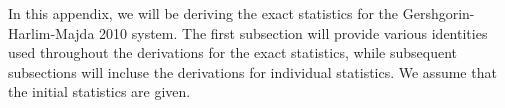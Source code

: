 In this appendix, we will be deriving the exact statistics for the Gershgorin-Harlim-Majda 2010 system. The first subsection will provide various identities used throughout the derivations for the exact statistics, while subsequent subsections will incluse the derivations for individual statistics. We assume that the initial statistics are given.